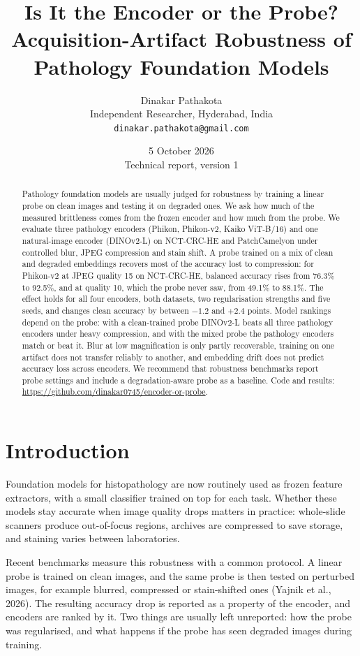 \documentclass[11pt,a4paper]{article}
\title{\textbf{Is It the Encoder or the Probe?\\ Acquisition-Artifact Robustness of Pathology Foundation Models}}
\author{Dinakar Pathakota\\[0.3em]
\small Independent Researcher, Hyderabad, India\\
\small \texttt{dinakar.pathakota@gmail.com}}
\date{5 October 2026\\[0.3em]\small Technical report, version 1}
\begin{document}
\maketitle

\begin{abstract}
\noindent Pathology foundation models are usually judged for robustness by training a linear probe on clean images and testing it on degraded ones. We ask how much of the measured brittleness comes from the frozen encoder and how much from the probe. We evaluate three pathology encoders (Phikon, Phikon-v2, Kaiko ViT-B/16) and one natural-image encoder (DINOv2-L) on NCT-CRC-HE and PatchCamelyon under controlled blur, JPEG compression and stain shift. A probe trained on a mix of clean and degraded embeddings recovers most of the accuracy lost to compression: for Phikon-v2 at JPEG quality 15 on NCT-CRC-HE, balanced accuracy rises from 76.3\% to 92.5\%, and at quality 10, which the probe never saw, from 49.1\% to 88.1\%. The effect holds for all four encoders, both datasets, two regularisation strengths and five seeds, and changes clean accuracy by between $-1.2$ and $+2.4$ points. Model rankings depend on the probe: with a clean-trained probe DINOv2-L beats all three pathology encoders under heavy compression, and with the mixed probe the pathology encoders match or beat it. Blur at low magnification is only partly recoverable, training on one artifact does not transfer reliably to another, and embedding drift does not predict accuracy loss across encoders. We recommend that robustness benchmarks report probe settings and include a degradation-aware probe as a baseline. Code and results: \url{https://github.com/dinakar0745/encoder-or-probe}.
\end{abstract}

\section{Introduction}

Foundation models for histopathology are now routinely used as frozen feature extractors, with a small classifier trained on top for each task. Whether these models stay accurate when image quality drops matters in practice: whole-slide scanners produce out-of-focus regions, archives are compressed to save storage, and staining varies between laboratories.

Recent benchmarks measure this robustness with a common protocol. A linear probe is trained on clean images, and the same probe is then tested on perturbed images, for example blurred, compressed or stain-shifted ones (Yajnik et al., 2026). The resulting accuracy drop is reported as a property of the encoder, and encoders are ranked by it. Two things are usually left unreported: how the probe was regularised, and what happens if the probe has seen degraded images during training.
\end{document}
